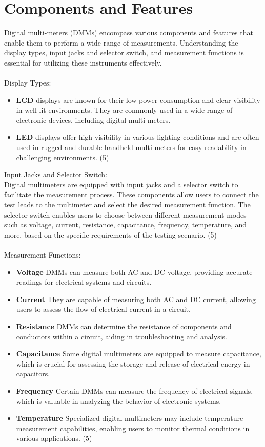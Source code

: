 \documentclass[12pt]{article}
\begin{document}
	\section{Components and Features}
	Digital multi-meters (DMMs) encompass various components and features that enable them to perform a wide range of measurements. Understanding the display types, input jacks and selector switch, and measurement functions is essential for utilizing these instruments effectively. \\ \\
	Display Types:
	\begin{itemize}
		\item \textbf{LCD} displays are known for their low power consumption and clear visibility in well-lit environments. They are commonly used in a wide range of electronic devices, including digital multi-meters.
		\item \textbf{LED} displays offer high visibility in various lighting conditions and are often used in rugged and durable handheld multi-meters for easy readability in challenging environments. (5)
	\end{itemize}
	Input Jacks and Selector Switch: \\
	
	Digital multimeters are equipped with input jacks and a selector switch to facilitate the measurement process. These components allow users to connect the test leads to the multimeter and select the desired measurement function. The selector switch enables users to choose between different measurement modes such as voltage, current, resistance, capacitance, frequency, temperature, and more, based on the specific requirements of the testing scenario. (5) \\ \\
	Measurement Functions: \\ 
	\begin{itemize}
		\item \textbf{Voltage} DMMs can measure both AC and DC voltage, providing accurate readings for electrical systems and circuits.
		\item \textbf{Current} They are capable of measuring both AC and DC current, allowing users to assess the flow of electrical current in a circuit.
		\item \textbf{Resistance} DMMs can determine the resistance of components and conductors within a circuit, aiding in troubleshooting and analysis.
		\item \textbf{Capacitance} Some digital multimeters are equipped to measure capacitance, which is crucial for assessing the storage and release of electrical energy in capacitors.
		\item \textbf{Frequency} Certain DMMs can measure the frequency of electrical signals, which is valuable in analyzing the behavior of electronic systems.
		\item \textbf{Temperature} Specialized digital multimeters may include temperature measurement capabilities, enabling users to monitor thermal conditions in various applications. (5)
	\end{itemize}
	
\end{document}
